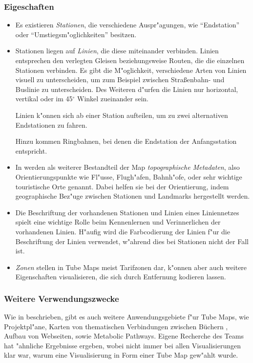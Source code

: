 \subsubsection{Eigeschaften}
\begin{itemize}
\item Es existieren \emph{Stationen}, die verschiedene Auspr"agungen, wie "`Endstation"' oder "`Umstiegsm"oglichkeiten"' besitzen. 

\item Stationen liegen auf \emph{Linien}, die diese miteinander verbinden. Linien entsprechen den verlegten Gleisen beziehungsweise Routen, die die einzelnen Stationen verbinden. Es gibt die M"oglichkeit, verschiedene Arten von Linien visuell zu unterscheiden, um zum Beispiel zwischen Stra\ss enbahn- und Buslinie zu unterscheiden. Des Weiteren d"urfen die Linien nur horizontal, vertikal oder im 45$^{\circ}$ Winkel zueinander sein. 

Linien k"onnen sich ab einer Station aufteilen, um zu zwei alternativen Endstationen zu fahren. 

Hinzu kommen Ringbahnen, bei denen die Endstation der Anfangsstation entspricht.

\item In \cite{automaticlayoutmetro08} werden als weiterer Bestandteil der Map \emph{topographische Metadaten}, also Orientierungspunkte wie Fl"usse, Flugh"afen, Bahnh"ofe, oder sehr wichtige touristische Orte genannt. Dabei helfen sie bei der Orientierung, indem geographische Bez"uge zwischen Stationen und Landmarks hergestellt werden.

\item Die Beschriftung der vorhandenen Stationen und Linien eines Liniennetzes spielt eine wichtige Rolle beim Kennenlernen und Verinnerlichen der vorhandenen Linien. H"aufig wird die Farbcodierung der Linien f"ur die Beschriftung der Linien verwendet, w"ahrend dies bei Stationen nicht der Fall ist. 

\item \emph{Zonen} stellen in Tube Maps meist Tarifzonen dar, k"onnen aber auch weitere Eigenschaften visualisieren, die sich durch Entfernung kodieren lassen. 
\end{itemize}

\subsubsection{Weitere Verwendungszwecke}
\label{tm:verwendungszwecke}
Wie in \cite{automaticlayoutmetro08} beschrieben, gibt es auch weitere Anwendungsgebiete f"ur Tube Maps, wie Projektpl"ane, Karten von thematischen Verbindungen zwischen Büchern \cite{oreilly}, Aufbau von Webseiten, sowie Metabolic Pathways. Eigene Recherche des Teams hat "ahnliche Ergebnisse ergeben, wobei nicht immer bei allen Visualisierungen klar war, warum eine Visualisierung in Form einer Tube Map gew"ahlt wurde. 

